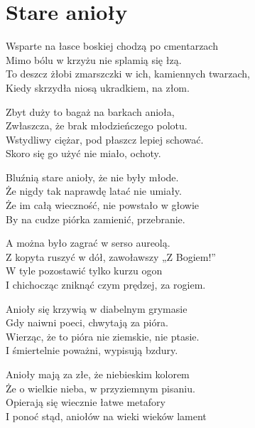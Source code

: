 \section{Stare anioły}
\begin{text}
Wsparte na łasce boskiej chodzą po cmentarzach\\
Mimo bólu w krzyżu nie splamią się łzą.\\
To deszcz żłobi zmarszczki w ich, kamiennych twarzach,\\
Kiedy skrzydła niosą ukradkiem, na złom.

Zbyt duży to bagaż na barkach anioła,\\
Zwłaszcza, że brak młodzieńczego polotu.\\
Wstydliwy ciężar, pod płaszcz lepiej schować.\\
Skoro się go użyć nie miało, ochoty.

Bluźnią stare anioły, że nie były młode.\\
Że nigdy tak naprawdę latać nie umiały.\\
Że im całą wieczność, nie powstało w głowie\\
By na cudze piórka zamienić, przebranie.

A można było zagrać w serso aureolą.\\
Z kopyta ruszyć w dół, zawoławszy „Z Bogiem!”\\
W tyle pozostawić tylko kurzu ogon\\
I chichocząc zniknąć czym prędzej, za rogiem.

Anioły się krzywią w diabelnym grymasie\\
Gdy naiwni poeci, chwytają za pióra.\\
Wierząc, że to pióra nie ziemskie, nie ptasie.\\
I śmiertelnie poważni, wypisują bzdury.

Anioły mają za złe, że niebieskim kolorem\\
Że o wielkie nieba, w przyziemnym pisaniu.\\
Opierają się wiecznie łatwe metafory\\
I ponoć stąd, aniołów na wieki wieków lament
\end{text}